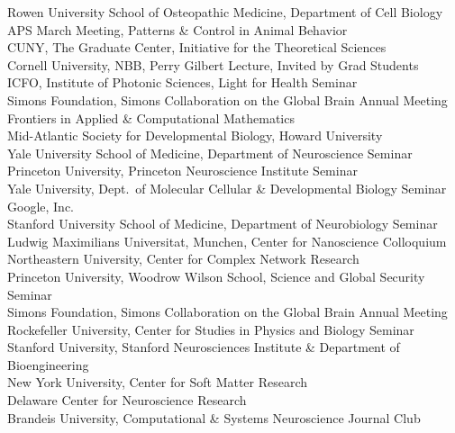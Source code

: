 \documentclass[11pt]{article}
\begin{document}
Rowen University School of Osteopathic Medicine, Department of Cell Biology \\
APS March Meeting, Patterns \& Control in Animal Behavior \\
CUNY, The Graduate Center, Initiative for the Theoretical Sciences\\
Cornell University, NBB, Perry Gilbert Lecture, Invited by Grad Students\\
ICFO, Institute of Photonic Sciences, Light for Health Seminar  \\
Simons Foundation, Simons Collaboration on the Global Brain Annual Meeting  \\ 
Frontiers in Applied \& Computational Mathematics\\
Mid-Atlantic Society for Developmental Biology, Howard University \\
Yale University School of Medicine, Department of Neuroscience Seminar \\
Princeton University, Princeton Neuroscience Institute Seminar \\
Yale University, Dept.~of Molecular Cellular \& Developmental Biology Seminar \\
Google, Inc. \\
Stanford University School of Medicine, Department of Neurobiology Seminar \\
Ludwig Maximilians Universitat, Munchen, Center for Nanoscience Colloquium \\
Northeastern University, Center for Complex Network Research  \\ 
Princeton University, Woodrow Wilson School, Science and Global Security Seminar \\
Simons Foundation, Simons Collaboration on the Global Brain Annual Meeting \\
Rockefeller University, Center for Studies in Physics and Biology Seminar \\
 Stanford University, Stanford Neurosciences Institute \& Department of Bioengineering \\
 New York University, Center for Soft Matter Research \\
 Delaware Center for Neuroscience Research  \\
  Brandeis University, Computational \& Systems Neuroscience Journal Club \\
\end{document}
